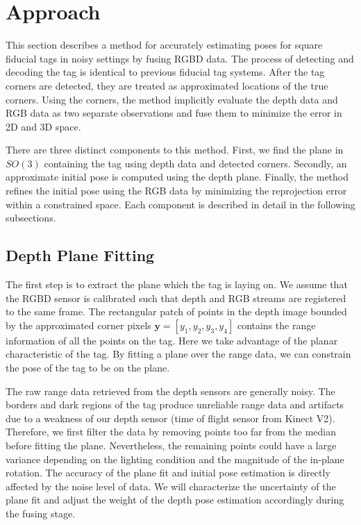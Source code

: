 \section{Approach}
\label{sec:approach}
This section describes a method for accurately estimating poses for square fiducial tags in noisy settings by fusing RGBD data. The process of detecting and decoding the tag is identical to previous fiducial tag systems. After the tag corners are detected, they are treated as approximated locations of the true corners. Using the corners, the method implicitly evaluate the depth data and RGB data as two separate observations and fuse them to minimize the error in 2D and 3D space.

There are three distinct components to this method. First, we find the plane in $SO(3)$ containing the tag using depth data and detected corners. Secondly, an approximate initial pose is computed using the depth plane. Finally, the method refines the initial pose using the RGB data by minimizing the reprojection error within a constrained space. Each component is described in detail in the following subsections. 

\subsection{Depth Plane Fitting}
The first step is to extract the plane which the tag is laying on. We assume that the RGBD sensor is calibrated such that depth and RGB streams are registered to the same frame. The rectangular patch of points in the depth image bounded by the approximated corner pixels $\boldsymbol{y} = [y_1, y_2, y_3, y_4]$ contains the range information of all the points on the tag. Here we take advantage of the planar characteristic of the tag. By fitting a plane over the range data, we can constrain the pose of the tag to be on the plane.

The raw range data retrieved from the depth sensors are generally noisy. The borders and dark regions of the tag produce unreliable range data and artifacts due to a weakness of our depth sensor (time of flight sensor from Kinect V2). Therefore, we first filter the data by removing points too far from the median before fitting the plane. Nevertheless, the remaining points could have a large variance depending on the lighting condition and the magnitude of the in-plane rotation. The accuracy of the plane fit and initial pose estimation is directly affected by the noise level of data. We will characterize the uncertainty of the plane fit and adjust the weight of the depth pose estimation accordingly during the fusing stage.


